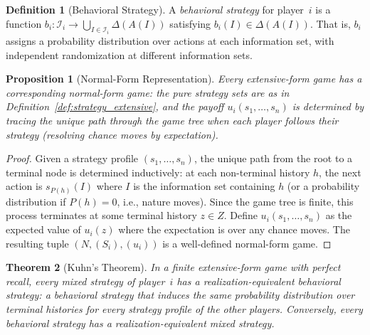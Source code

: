 \documentclass[11pt,a4paper]{article}
\theoremstyle{definition}
\newtheorem{definition}{Definition}[section]
\theoremstyle{plain}
\newtheorem{theorem}{Theorem}[section]
\newtheorem{proposition}[theorem]{Proposition}
\theoremstyle{remark}
\begin{document}
\begin{definition}[Behavioral Strategy]
\label{def:behavioral}
A \emph{behavioral strategy} for player~$i$ is a function
$b_i : \mathcal{I}_i \to \bigcup_{I \in \mathcal{I}_i} \Delta(A(I))$
satisfying $b_i(I) \in \Delta(A(I))$. That is, $b_i$ assigns a probability
distribution over actions at each information set, with independent randomization
at different information sets.
\end{definition}

\begin{proposition}[Normal-Form Representation]
\label{prop:normal_form_rep}
Every extensive-form game has a corresponding normal-form game: the pure strategy
sets are as in Definition~\ref{def:strategy_extensive}, and the payoff
$u_i(s_1, \ldots, s_n)$ is determined by tracing the unique path through the game
tree when each player follows their strategy (resolving chance moves by expectation).
\end{proposition}

\begin{proof}
Given a strategy profile $(s_1, \ldots, s_n)$, the unique path from the root to a
terminal node is determined inductively: at each non-terminal history $h$, the next
action is $s_{P(h)}(I)$ where $I$ is the information set containing $h$ (or a
probability distribution if $P(h) = 0$, i.e., nature moves). Since the game tree is
finite, this process terminates at some terminal history $z \in Z$. Define
$u_i(s_1, \ldots, s_n)$ as the expected value of $u_i(z)$ where the expectation is
over any chance moves. The resulting tuple $(N, (S_i), (u_i))$ is a well-defined
normal-form game.
\end{proof}

\begin{theorem}[Kuhn's Theorem]
\label{thm:kuhn}
In a finite extensive-form game with perfect recall, every mixed strategy of player~$i$
has a \emph{realization-equivalent} behavioral strategy: a behavioral strategy that
induces the same probability distribution over terminal histories for every strategy
profile of the other players. Conversely, every behavioral strategy has a
realization-equivalent mixed strategy.
\end{theorem}
\end{document}
